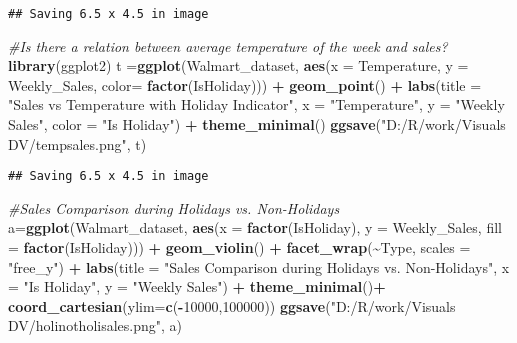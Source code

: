 \documentclass[
]{article}
\newenvironment{Shaded}{\begin{snugshade}}{\end{snugshade}}
\newcommand{\AttributeTok}[1]{\textcolor[rgb]{0.13,0.29,0.53}{#1}}
\newcommand{\CommentTok}[1]{\textcolor[rgb]{0.56,0.35,0.01}{\textit{#1}}}
\newcommand{\DecValTok}[1]{\textcolor[rgb]{0.00,0.00,0.81}{#1}}
\newcommand{\FunctionTok}[1]{\textcolor[rgb]{0.13,0.29,0.53}{\textbf{#1}}}
\newcommand{\NormalTok}[1]{#1}
\newcommand{\OtherTok}[1]{\textcolor[rgb]{0.56,0.35,0.01}{#1}}
\newcommand{\SpecialCharTok}[1]{\textcolor[rgb]{0.81,0.36,0.00}{\textbf{#1}}}
\newcommand{\StringTok}[1]{\textcolor[rgb]{0.31,0.60,0.02}{#1}}
\begin{document}
\begin{verbatim}
## Saving 6.5 x 4.5 in image
\end{verbatim}

\begin{Shaded}
\begin{Highlighting}[]
\CommentTok{\#Is there a relation between average temperature of the week and sales?}
\FunctionTok{library}\NormalTok{(ggplot2)}
\NormalTok{t }\OtherTok{=}\FunctionTok{ggplot}\NormalTok{(Walmart\_dataset, }\FunctionTok{aes}\NormalTok{(}\AttributeTok{x =}\NormalTok{ Temperature, }\AttributeTok{y =}\NormalTok{ Weekly\_Sales,}
                               \AttributeTok{color=} \FunctionTok{factor}\NormalTok{(IsHoliday))) }\SpecialCharTok{+}
  \FunctionTok{geom\_point}\NormalTok{() }\SpecialCharTok{+}
  \FunctionTok{labs}\NormalTok{(}\AttributeTok{title =} \StringTok{"Sales vs Temperature with Holiday Indicator"}\NormalTok{,}
       \AttributeTok{x =} \StringTok{"Temperature"}\NormalTok{,}
       \AttributeTok{y =} \StringTok{"Weekly Sales"}\NormalTok{,}
       \AttributeTok{color =} \StringTok{"Is Holiday"}\NormalTok{) }\SpecialCharTok{+}
  \FunctionTok{theme\_minimal}\NormalTok{()}
\FunctionTok{ggsave}\NormalTok{(}\StringTok{"D:/R/work/Visuals DV/tempsales.png"}\NormalTok{, t)}
\end{Highlighting}
\end{Shaded}

\begin{verbatim}
## Saving 6.5 x 4.5 in image
\end{verbatim}

\begin{Shaded}
\begin{Highlighting}[]
\CommentTok{\#Sales Comparison during Holidays vs. Non{-}Holidays}
\NormalTok{a}\OtherTok{=}\FunctionTok{ggplot}\NormalTok{(Walmart\_dataset, }\FunctionTok{aes}\NormalTok{(}\AttributeTok{x =} \FunctionTok{factor}\NormalTok{(IsHoliday), }
                              \AttributeTok{y =}\NormalTok{ Weekly\_Sales, }\AttributeTok{fill =} \FunctionTok{factor}\NormalTok{(IsHoliday))) }\SpecialCharTok{+}
  \FunctionTok{geom\_violin}\NormalTok{() }\SpecialCharTok{+}
  \FunctionTok{facet\_wrap}\NormalTok{(}\SpecialCharTok{\textasciitilde{}}\NormalTok{Type, }\AttributeTok{scales =} \StringTok{"free\_y"}\NormalTok{) }\SpecialCharTok{+}
  \FunctionTok{labs}\NormalTok{(}\AttributeTok{title =} \StringTok{"Sales Comparison during Holidays vs. Non{-}Holidays"}\NormalTok{,}
       \AttributeTok{x =} \StringTok{"Is Holiday"}\NormalTok{,}
       \AttributeTok{y =} \StringTok{"Weekly Sales"}\NormalTok{) }\SpecialCharTok{+}
  \FunctionTok{theme\_minimal}\NormalTok{()}\SpecialCharTok{+}
  \FunctionTok{coord\_cartesian}\NormalTok{(}\AttributeTok{ylim=}\FunctionTok{c}\NormalTok{(}\SpecialCharTok{{-}}\DecValTok{10000}\NormalTok{,}\DecValTok{100000}\NormalTok{))}
\FunctionTok{ggsave}\NormalTok{(}\StringTok{"D:/R/work/Visuals DV/holinotholisales.png"}\NormalTok{, a)}
\end{Highlighting}
\end{Shaded}
\end{document}
